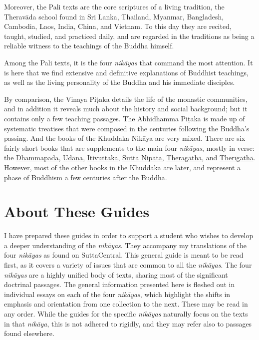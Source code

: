 \documentclass[12pt,openany]{book}%
\begin{document}
Moreover, the Pali texts are the core scriptures of a living tradition, the \textsanskrit{Theravāda} school found in Sri Lanka, Thailand, Myanmar, Bangladesh, Cambodia, Laos, India, China, and Vietnam. To this day they are recited, taught, studied, and practiced daily, and are regarded in the traditions as being a reliable witness to the teachings of the Buddha himself.

Among the Pali texts, it is the four \textit{\textsanskrit{nikāyas}} that command the most attention. It is here that we find extensive and definitive explanations of Buddhist teachings, as well as the living personality of the Buddha and his immediate disciples.

By comparison, the Vinaya \textsanskrit{Piṭaka} details the life of the monastic communities, and in addition it reveals much about the history and social background; but it contains only a few teaching passages. The Abhidhamma \textsanskrit{Piṭaka} is made up of systematic treatises that were composed in the centuries following the Buddha’s passing. And the books of the Khuddaka \textsanskrit{Nikāya} are very mixed. There are six fairly short books that are supplements to the main four \textit{\textsanskrit{nikāyas}}, mostly in verse: the \href{dhp}{Dhammapada}, \href{ud}{Udāna}, \href{iti}{Itivuttaka}, \href{snp}{Sutta Nipāta}, \href{thag}{Theragāthā}, and \href{thig}{Therīgāthā}. However, most of the other books in the Khuddaka are later, and represent a phase of Buddhism a few centuries after the Buddha.

\section*{About These Guides}

I have prepared these guides in order to support a student who wishes to develop a deeper understanding of the \textit{\textsanskrit{nikāyas}}. They accompany my translations of the four \textit{\textsanskrit{nikāyas}} as found on SuttaCentral. This general guide is meant to be read first, as it covers a variety of issues that are common to all the \textit{\textsanskrit{nikāyas}}. The four \textit{\textsanskrit{nikāyas}} are a highly unified body of texts, sharing most of the significant doctrinal passages. The general information presented here is fleshed out in individual essays on each of the four \textit{\textsanskrit{nikāyas}}, which highlight the shifts in emphasis and orientation from one collection to the next. These may be read in any order. While the guides for the specific \textit{\textsanskrit{nikāyas}} naturally focus on the texts in that \textit{\textsanskrit{nikāya}}, this is not adhered to rigidly, and they may refer also to passages found elsewhere.
\end{document}
